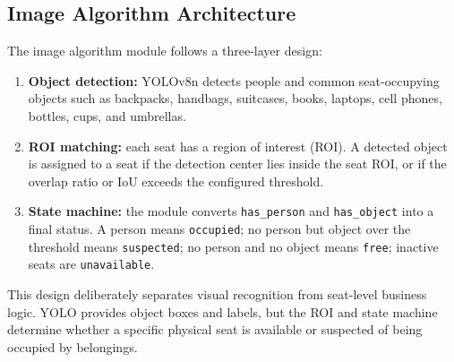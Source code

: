 

\subsection{Image Algorithm Architecture}

The image algorithm module follows a three-layer design:

\begin{enumerate}
  \item \textbf{Object detection:} YOLOv8n detects people and common seat-occupying objects such as backpacks, handbags, suitcases, books, laptops, cell phones, bottles, cups, and umbrellas.
  \item \textbf{ROI matching:} each seat has a region of interest (ROI). A detected object is assigned to a seat if the detection center lies inside the seat ROI, or if the overlap ratio or IoU exceeds the configured threshold.
  \item \textbf{State machine:} the module converts \texttt{has\_person} and \texttt{has\_object} into a final status. A person means \texttt{occupied}; no person but object over the threshold means \texttt{suspected}; no person and no object means \texttt{free}; inactive seats are \texttt{unavailable}.
\end{enumerate}

This design deliberately separates visual recognition from seat-level business logic. YOLO provides object boxes and labels, but the ROI and state machine determine whether a specific physical seat is available or suspected of being occupied by belongings.
